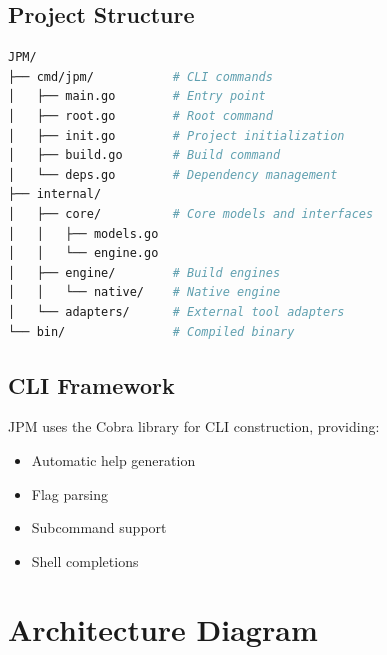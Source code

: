\documentclass[12pt,a4paper]{report}
\begin{document}
\subsection{Project Structure}

\begin{lstlisting}[language=bash, caption=JPM Project Structure]
JPM/
├── cmd/jpm/           # CLI commands
│   ├── main.go        # Entry point
│   ├── root.go        # Root command
│   ├── init.go        # Project initialization
│   ├── build.go       # Build command
│   └── deps.go        # Dependency management
├── internal/
│   ├── core/          # Core models and interfaces
│   │   ├── models.go
│   │   └── engine.go
│   ├── engine/        # Build engines
│   │   └── native/    # Native engine
│   └── adapters/      # External tool adapters
└── bin/               # Compiled binary
\end{lstlisting}

\subsection{CLI Framework}

JPM uses the Cobra library for CLI construction, providing:
\begin{itemize}
    \item Automatic help generation
    \item Flag parsing
    \item Subcommand support
    \item Shell completions
\end{itemize}

\section{Architecture Diagram}
\end{document}
